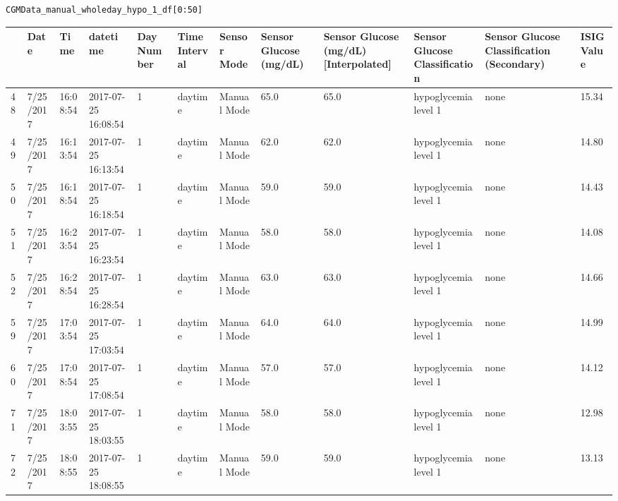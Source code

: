 \bigskip

\begin{verbatim}
CGMData_manual_wholeday_hypo_1_df[0:50]
\end{verbatim}

\bigskip\noindent
\begin{tabular}{p{}p{}p{}p{}p{}p{}p{}p{}p{}p{}p{}p{}}
\toprule
 & Date & Time & datetime & Day Number & Time Interval & Sensor Mode & Sensor Glucose (mg/dL) & Sensor Glucose (mg/dL) [Interpolated] & Sensor Glucose Classification & Sensor Glucose Classification (Secondary) & ISIG Value \\
\hline
48 & 7/25/2017 & 16:08:54 & 2017-07-25 16:08:54 & 1 & daytime & Manual Mode & 65.0 & 65.0 & hypoglycemia level 1 & none & 15.34 \\
\hline
49 & 7/25/2017 & 16:13:54 & 2017-07-25 16:13:54 & 1 & daytime & Manual Mode & 62.0 & 62.0 & hypoglycemia level 1 & none & 14.80 \\
\hline
50 & 7/25/2017 & 16:18:54 & 2017-07-25 16:18:54 & 1 & daytime & Manual Mode & 59.0 & 59.0 & hypoglycemia level 1 & none & 14.43 \\
\hline
51 & 7/25/2017 & 16:23:54 & 2017-07-25 16:23:54 & 1 & daytime & Manual Mode & 58.0 & 58.0 & hypoglycemia level 1 & none & 14.08 \\
\hline
52 & 7/25/2017 & 16:28:54 & 2017-07-25 16:28:54 & 1 & daytime & Manual Mode & 63.0 & 63.0 & hypoglycemia level 1 & none & 14.66 \\
\hline
59 & 7/25/2017 & 17:03:54 & 2017-07-25 17:03:54 & 1 & daytime & Manual Mode & 64.0 & 64.0 & hypoglycemia level 1 & none & 14.99 \\
\hline
60 & 7/25/2017 & 17:08:54 & 2017-07-25 17:08:54 & 1 & daytime & Manual Mode & 57.0 & 57.0 & hypoglycemia level 1 & none & 14.12 \\
\hline
71 & 7/25/2017 & 18:03:55 & 2017-07-25 18:03:55 & 1 & daytime & Manual Mode & 58.0 & 58.0 & hypoglycemia level 1 & none & 12.98 \\
\hline
72 & 7/25/2017 & 18:08:55 & 2017-07-25 18:08:55 & 1 & daytime & Manual Mode & 59.0 & 59.0 & hypoglycemia level 1 & none & 13.13 \\

\end{tabular}
